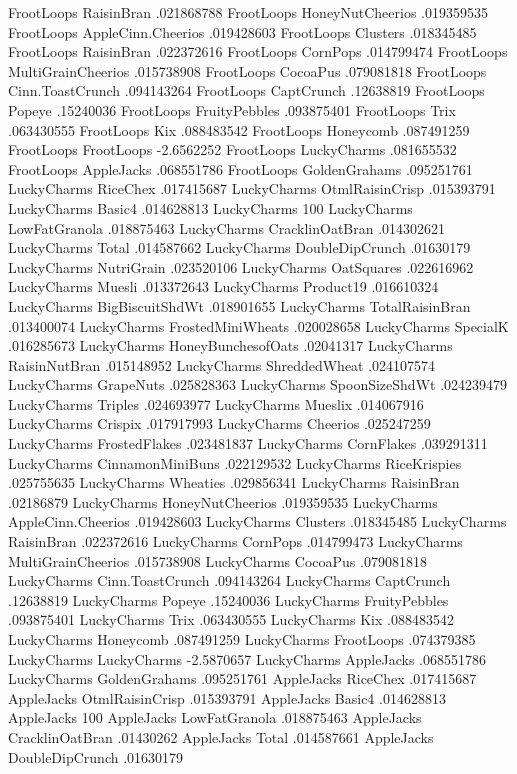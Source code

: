 FrootLoops	RaisinBran	.021868788
FrootLoops	HoneyNutCheerios	.019359535
FrootLoops	AppleCinn.Cheerios	.019428603
FrootLoops	Clusters	.018345485
FrootLoops	RaisinBran	.022372616
FrootLoops	CornPops	.014799474
FrootLoops	MultiGrainCheerios	.015738908
FrootLoops	CocoaPus	.079081818
FrootLoops	Cinn.ToastCrunch	.094143264
FrootLoops	CaptCrunch	.12638819
FrootLoops	Popeye	.15240036
FrootLoops	FruityPebbles	.093875401
FrootLoops	Trix	.063430555
FrootLoops	Kix	.088483542
FrootLoops	Honeycomb	.087491259
FrootLoops	FrootLoops	-2.6562252
FrootLoops	LuckyCharms	.081655532
FrootLoops	AppleJacks	.068551786
FrootLoops	GoldenGrahams	.095251761
LuckyCharms	RiceChex	.017415687
LuckyCharms	OtmlRaisinCrisp	.015393791
LuckyCharms	Basic4	.014628813
LuckyCharms	100%
LuckyCharms	LowFatGranola	.018875463
LuckyCharms	CracklinOatBran	.014302621
LuckyCharms	Total	.014587662
LuckyCharms	DoubleDipCrunch	.01630179
LuckyCharms	NutriGrain	.023520106
LuckyCharms	OatSquares	.022616962
LuckyCharms	Muesli	.013372643
LuckyCharms	Product19	.016610324
LuckyCharms	BigBiscuitShdWt	.018901655
LuckyCharms	TotalRaisinBran	.013400074
LuckyCharms	FrostedMiniWheats	.020028658
LuckyCharms	SpecialK	.016285673
LuckyCharms	HoneyBunchesofOats	.02041317
LuckyCharms	RaisinNutBran	.015148952
LuckyCharms	ShreddedWheat	.024107574
LuckyCharms	GrapeNuts	.025828363
LuckyCharms	SpoonSizeShdWt	.024239479
LuckyCharms	Triples	.024693977
LuckyCharms	Mueslix	.014067916
LuckyCharms	Crispix	.017917993
LuckyCharms	Cheerios	.025247259
LuckyCharms	FrostedFlakes	.023481837
LuckyCharms	CornFlakes	.039291311
LuckyCharms	CinnamonMiniBuns	.022129532
LuckyCharms	RiceKrispies	.025755635
LuckyCharms	Wheaties	.029856341
LuckyCharms	RaisinBran	.02186879
LuckyCharms	HoneyNutCheerios	.019359535
LuckyCharms	AppleCinn.Cheerios	.019428603
LuckyCharms	Clusters	.018345485
LuckyCharms	RaisinBran	.022372616
LuckyCharms	CornPops	.014799473
LuckyCharms	MultiGrainCheerios	.015738908
LuckyCharms	CocoaPus	.079081818
LuckyCharms	Cinn.ToastCrunch	.094143264
LuckyCharms	CaptCrunch	.12638819
LuckyCharms	Popeye	.15240036
LuckyCharms	FruityPebbles	.093875401
LuckyCharms	Trix	.063430555
LuckyCharms	Kix	.088483542
LuckyCharms	Honeycomb	.087491259
LuckyCharms	FrootLoops	.074379385
LuckyCharms	LuckyCharms	-2.5870657
LuckyCharms	AppleJacks	.068551786
LuckyCharms	GoldenGrahams	.095251761
AppleJacks	RiceChex	.017415687
AppleJacks	OtmlRaisinCrisp	.015393791
AppleJacks	Basic4	.014628813
AppleJacks	100%
AppleJacks	LowFatGranola	.018875463
AppleJacks	CracklinOatBran	.01430262
AppleJacks	Total	.014587661
AppleJacks	DoubleDipCrunch	.01630179
